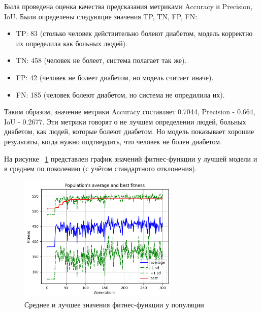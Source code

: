 \documentclass{article}
\begin{document}
Была проведена оценка качества предсказания метриками Accuracy и Precision, IoU. Были определены следующие значения TP, TN, FP, FN:

\begin{itemize}
    \item TP: 83 (столько человек действительно болеют диабетом, модель корректно их определила как больных людей).
    \item TN: 458 (человек не болеет, система полагает так же).
    \item FP: 42 (человек не болеет диабетом, но модель считает иначе).
    \item FN: 185 (человек болеют диабетом, но система не опредилила их).    
\end{itemize}

Таким образом, значение метрики Accuracy составляет 0.7044, Precision - 0.664, IoU - 0.2677. Эти метрики говорят о не лучшем определении людей, больных диабетом, как людей, которые болеют диабетом. Но модель показывает хорошие результаты, когда нужно подтвердить, что человек не болен диабетом.

На рисунке ~\ref{fig:Output1} представлен график значений фитнес-функции у лучшей модели и в среднем по поколению (с учётом стандартного отклонения).

\begin{figure}[h]
	\centering
    \includegraphics[width=3in]{output1}
    \caption{Среднее и лучшее значения фитнес-функции у популяции}
    \label{fig:Output1}
\end{figure}
\end{document}
